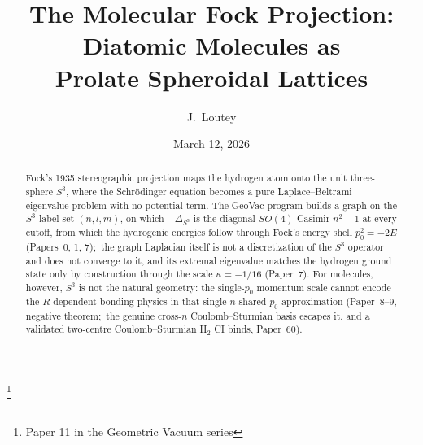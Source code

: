 \documentclass[aps,pra,twocolumn,superscriptaddress,longbibliography]{revtex4-2}
\begin{document}
\title{The Molecular Fock Projection: Diatomic Molecules as\\
Prolate Spheroidal Lattices}
\thanks{Paper 11 in the Geometric Vacuum series}

\author{J.~Loutey}

\date{March 12, 2026}


\begin{abstract}
Fock's 1935 stereographic projection maps the hydrogen atom onto the
unit three-sphere $S^3$, where the Schr\"odinger equation becomes a
pure Laplace--Beltrami eigenvalue problem with no potential term.  The
GeoVac program builds a graph on the $S^3$ label set $(n,l,m)$, on which
$-\Delta_{S^3}$ is the diagonal $SO(4)$ Casimir $n^2-1$ at every
cutoff, from which the hydrogenic energies follow through Fock's energy
shell $p_0^2 = -2E$ (Papers~0, 1, 7);\
the graph Laplacian itself is not a discretization of the $S^3$
operator and does not converge to it, and its extremal eigenvalue
matches the hydrogen ground state only by construction through the
scale $\kappa = -1/16$ (Paper~7).  For molecules, however, $S^3$ is not the natural
geometry: the single-$p_0$ momentum scale cannot encode the
$R$-dependent bonding physics in that single-$n$ shared-$p_0$ approximation
(Paper~8--9, negative theorem;\ the genuine cross-$n$ Coulomb--Sturmian basis
escapes it, and a validated two-centre Coulomb--Sturmian H$_2$ CI binds,
Paper~60).


\end{abstract}
\end{document}
